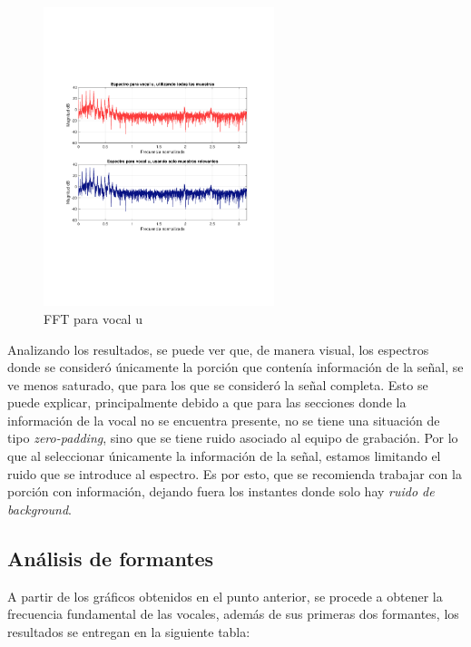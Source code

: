 	\begin{figure}[H]
		\center
		\includegraphics[width=0.6\textwidth,clip, trim = {1.9cm 6.8cm 2.3cm 7cm}]{../plots/u_fft.pdf}
		\caption{FFT para vocal u}
		\label{fig:u_fft}
	\end{figure}
	
	
	Analizando los resultados, se puede ver que, de manera visual, los espectros donde se consideró únicamente la porción que contenía información de la señal, se ve menos saturado, que para los que se consideró la señal completa. Esto se puede explicar, principalmente debido a que para las secciones donde la información de la vocal no se encuentra presente, no se tiene una situación de tipo \textit{zero-padding}, sino que se tiene ruido asociado al equipo de grabación. Por lo que al seleccionar únicamente la información de la señal, estamos limitando el ruido que se introduce al espectro. Es por esto, que se recomienda trabajar con la porción con información, dejando fuera los instantes donde solo hay \textit{ruido de background}.
	
	\subsection{Análisis de formantes}
	
	A partir de los gráficos obtenidos en el punto anterior, se procede a obtener la frecuencia fundamental de las vocales, además de sus primeras dos formantes, los resultados se entregan en la siguiente tabla:
	
